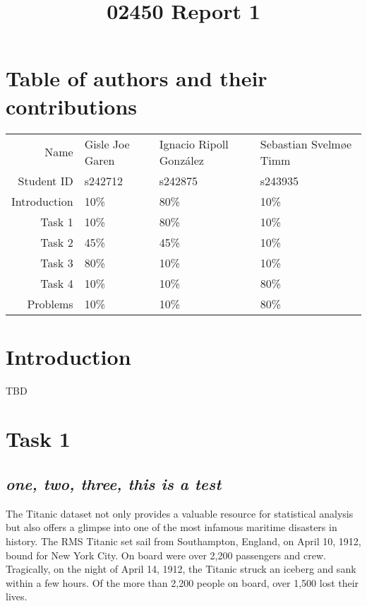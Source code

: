 \documentclass[twoside,11pt]{article}
\title{02450 Report 1}
\makeatletter
\let\@oldsection\section
\renewcommand\section[1]{\@oldsection*{#1}}
\let\@oldsubsection\subsection
\renewcommand\subsection[1]{\@oldsubsection*{\textit{#1}}}
\makeatother
\begin{document}
\maketitle\vspace{-3em}

\section{Table of authors and their contributions}

\begin{center}
	\begin{tabular}{| r | l | l | l |}
		\hline
				Name & Gisle Joe Garen & Ignacio Ripoll González & Sebastian Svelmøe Timm\\
		Student ID   & s242712 & s242875 & s243935\\
		\hline
		Introduction & 10\% & 80\% & 10\%\\
			  Task 1 & 10\% & 80\% & 10\%\\
			  Task 2 & 45\% & 45\% & 10\%\\
			  Task 3 & 80\% & 10\% & 10\%\\
			  Task 4 & 10\% & 10\% & 80\%\\
			Problems & 10\% & 10\% & 80\%\\
		\hline
	\end{tabular}
\end{center}

\section{Introduction}

TBD

\section{Task 1}

\subsection{one, two, three, this is a test}

The Titanic dataset not only provides a valuable resource for statistical analysis but also offers a glimpse into one of the most infamous maritime disasters in history. The RMS Titanic set sail from Southampton, England, on April 10, 1912, bound for New York City. On board were over 2,200 passengers and crew. Tragically, on the night of April 14, 1912, the Titanic struck an iceberg and sank within a few hours. Of the more than 2,200 people on board, over 1,500 lost their lives.
\end{document}
